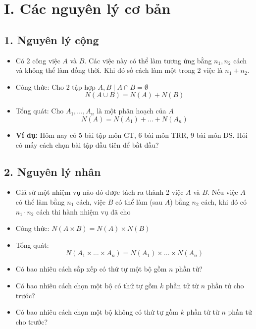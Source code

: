 \documentclass[12pt,a4paper]{article}
\begin{document}
\section*{I. Các nguyên lý cơ bản}

\subsection*{1. Nguyên lý cộng}
\begin{itemize}
    \item Có 2 công việc $A$ và $B$. Các việc này có thể làm tương ứng bằng $n_1, n_2$ cách và không thể làm đồng thời. Khi đó số cách làm một trong 2 việc là $n_1 + n_2$.
    \item Công thức: Cho 2 tập hợp $A, B \mid A \cap B = \emptyset$
    $$N(A \cup B) = N(A) + N(B)$$
    \item Tổng quát: Cho $A_1, \dots, A_n$ là một phân hoạch của $A$
    $$N(A) = N(A_1) + \dots + N(A_n)$$
\end{itemize}

\begin{itemize}
    \item \textbf{Ví dụ:} Hôm nay có 5 bài tập môn GT, 6 bài môn TRR, 9 bài môn ĐS. Hỏi có mấy cách chọn bài tập đầu tiên để bắt đầu?
\end{itemize}

\subsection*{2. Nguyên lý nhân}
\begin{itemize}
    \item Giả sử một nhiệm vụ nào đó được tách ra thành 2 việc $A$ và $B$. Nếu việc $A$ có thể làm bằng $n_1$ cách, việc $B$ có thể làm (sau $A$) bằng $n_2$ cách, khi đó có $n_1 \cdot n_2$ cách thi hành nhiệm vụ đã cho
    \item Công thức: $N(A \times B) = N(A) \times N(B)$
    \item Tổng quát:
    $$N(A_1 \times \dots \times A_n) = N(A_1) \times \dots \times N(A_n)$$
\end{itemize}

\begin{itemize}
    \item Có bao nhiêu cách sắp xếp có thứ tự một bộ gồm $n$ phần tử?
    \item Có bao nhiêu cách chọn một bộ có thứ tự gồm $k$ phần tử từ $n$ phần tử cho trước?
    \item Có bao nhiêu cách chọn một bộ không có thứ tự gồm $k$ phần tử từ $n$ phần tử cho trước?
\end{itemize}
\end{document}
